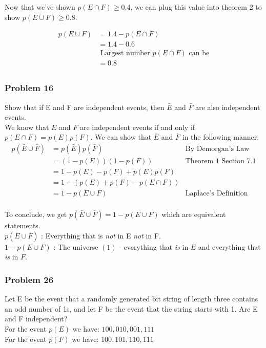 \documentclass[fontsize=11pt]{scrartcl} %
\begin{document}
Now that we've shown $p(E \cap F) \ge 0.4$, we can plug this value into theorem 2 to show $p(E\cup F) \ge 0.8$.

\begin{align*}
p(E \cup F) &= 1.4 - p(E \cap F) \\
			&= 1.4 - 0.6\\
			&\text{ Largest number $p(E \cap F)$ can be}\\
			&= 0.8\\
\end{align*}
\subsubsection*{Problem 16}
Show that if E and F are independent events, then $\bar E$ and $\bar F$ are also independent events.\\
We know that $E$ and $F$ are independent events if and only if $p(E \cap F) = p(E)p(F)$. We can show that $\bar E$ and $\bar F$ in the following manner:\\
\begin{align*}
p(\bar E \cup \bar F) &= p(\bar E)p(\bar F) &\text{By Demorgan's Law}\\
					  &= (1 - p(E))(1 - p(F)) &\text{Theorem 1 Section 7.1}\\
					  &= 1 - p(E) -p(F) + p(E)p(F)\\
					  &= 1 - (p(E) + p(F) - p(E \cap F))\\
					  &= 1 - p(E \cup F) & \text{Laplace's Definition}\\
\end{align*}

To conclude, we get $p(\bar E \cup \bar F) = 1 - p(E \cup F)$ which are equivalent statements.\\
$p(\bar E \cup \bar F)$ : Everything that is \emph{not} in E \emph{not} in F.\\
$1 - p(E \cup F)$ : The universe $(1)$ - everything that \emph{is} in $E$ and everything that \emph{is} in $F$.

\subsubsection*{Problem 26}
Let E be the event that a randomly generated bit string of length three contains an odd number of 1s, and let F be the event that the string starts with 1. Are E and F independent?\\

For the event $p(E)$ we have: $100, 010, 001, 111$\\
For the event $p(F)$ we have: $100, 101, 110, 111$\\
\end{document}
